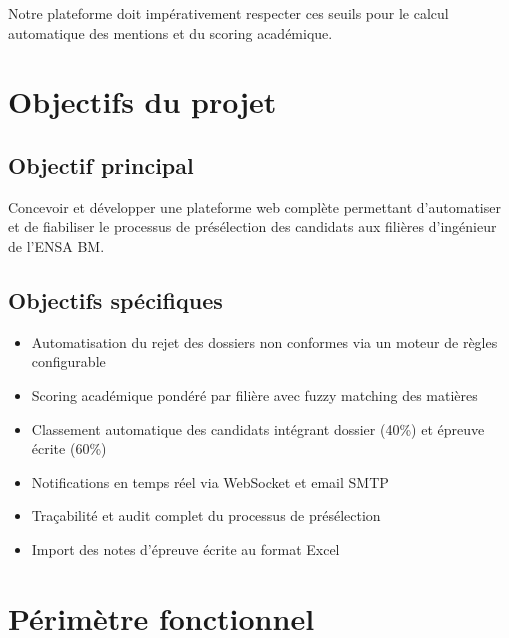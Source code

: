 Notre plateforme doit impérativement respecter ces seuils pour le calcul automatique des mentions et du scoring académique.

\section{Objectifs du projet}

\subsection{Objectif principal}

Concevoir et développer une plateforme web complète permettant d'automatiser et de fiabiliser le processus de présélection des candidats aux filières d'ingénieur de l'ENSA BM.

\subsection{Objectifs spécifiques}

\begin{itemize}
\item Automatisation du rejet des dossiers non conformes via un moteur de règles configurable
\item Scoring académique pondéré par filière avec fuzzy matching des matières
\item Classement automatique des candidats intégrant dossier (40\%) et épreuve écrite (60\%)
\item Notifications en temps réel via WebSocket et email SMTP
\item Traçabilité et audit complet du processus de présélection
\item Import des notes d'épreuve écrite au format Excel
\end{itemize}

\section{Périmètre fonctionnel}

